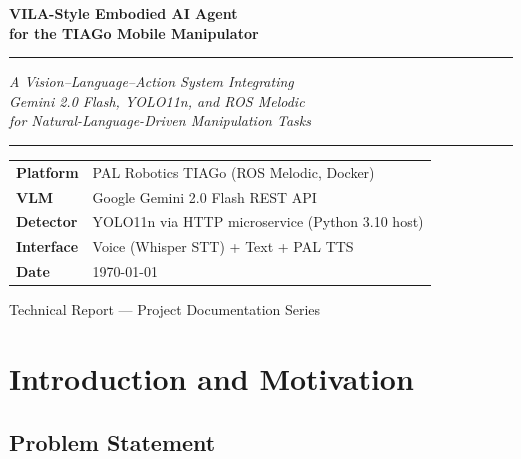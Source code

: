 \documentclass[12pt,a4paper]{report}
\begin{document}

\begin{titlepage}
  \centering
  \vspace*{2cm}
  {\Huge\bfseries\color{darkblue}
    VILA-Style Embodied AI Agent\\[0.4em]
    for the TIAGo Mobile Manipulator
  \par}
  \vspace{1cm}
  \rule{\linewidth}{1.5pt}
  \vspace{0.5cm}
  {\large\itshape
    A Vision--Language--Action System Integrating\\
    Gemini 2.0 Flash, YOLO11n, and ROS Melodic\\
    for Natural-Language-Driven Manipulation Tasks
  \par}
  \vspace{0.5cm}
  \rule{\linewidth}{0.8pt}
  \vspace{2cm}

  \begin{tabular}{ll}
    \textbf{Platform}  & PAL Robotics TIAGo (ROS Melodic, Docker) \\
    \textbf{VLM}       & Google Gemini 2.0 Flash REST API \\
    \textbf{Detector}  & YOLO11n via HTTP microservice (Python 3.10 host) \\
    \textbf{Interface} & Voice (Whisper STT) + Text + PAL TTS \\
    \textbf{Date}      & \today \\
  \end{tabular}

  \vfill
  {\small Technical Report — Project Documentation Series}
\end{titlepage}

\tableofcontents
\clearpage

\chapter{Introduction and Motivation}

\section{Problem Statement}
\end{document}
